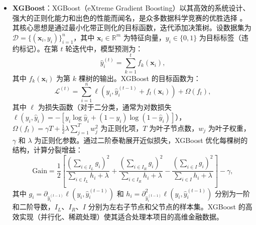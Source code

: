 \documentclass{thuemp}
\begin{document}
\begin{itemize}
    \item \textbf{XGBoost}：XGBoost（eXtreme Gradient Boosting）以其高效的系统设计、强大的正则化能力和出色的性能而闻名，是众多数据科学竞赛的优胜选择 \citep{chen2016xgboost}。其核心思想是通过最小化带正则化的目标函数，迭代添加决策树。设数据集为 $\mathcal{D} = \{(\mathbf{x}_i, y_i)\}_{i=1}^n$，其中 $\mathbf{x}_i \in \mathbb{R}^m$ 为特征向量，$y_i \in \{0, 1\}$ 为目标标签（违约标记）。在第 $t$ 轮迭代中，模型预测为：
    \[
    \hat{y}_i^{(t)} = \sum_{k=1}^t f_k(\mathbf{x}_i),
    \]
    其中 $f_k(\mathbf{x}_i)$ 为第 $k$ 棵树的输出。XGBoost 的目标函数为：
    \[
    \mathcal{L}^{(t)} = \sum_{i=1}^n \ell(y_i, \hat{y}_i^{(t-1)} + f_t(\mathbf{x}_i)) + \Omega(f_t),
    \]
    其中 $\ell$ 为损失函数（对于二分类，通常为对数损失 $\ell(y_i, \hat{y}_i) = -[y_i \log \hat{y}_i + (1-y_i) \log (1-\hat{y}_i)]$），$\Omega(f_t) = \gamma T + \frac{1}{2} \lambda \sum_{j=1}^T w_j^2$ 为正则化项，$T$ 为叶子节点数，$w_j$ 为叶子权重，$\gamma$ 和 $\lambda$ 为正则化参数。通过二阶泰勒展开近似损失，XGBoost 优化每棵树的结构，计算分裂增益：
    \[
    \text{Gain} = \frac{1}{2} \left[ \frac{(\sum_{i \in I_L} g_i)^2}{\sum_{i \in I_L} h_i + \lambda} + \frac{(\sum_{i \in I_R} g_i)^2}{\sum_{i \in I_R} h_i + \lambda} - \frac{(\sum_{i \in I} g_i)^2}{\sum_{i \in I} h_i + \lambda} \right] - \gamma,
    \]
    其中 $g_i = \partial_{\hat{y}_i^{(t-1)}} \ell(y_i, \hat{y}_i^{(t-1)})$ 和 $h_i = \partial^2_{\hat{y}_i^{(t-1)}} \ell(y_i, \hat{y}_i^{(t-1)})$ 分别为一阶和二阶导数，$I_L$、$I_R$、$I$ 分别为左右子节点和父节点的样本集。XGBoost 的高效实现（并行化、稀疏处理）使其适合处理本项目的高维金融数据。


\end{itemize}
\end{document}
